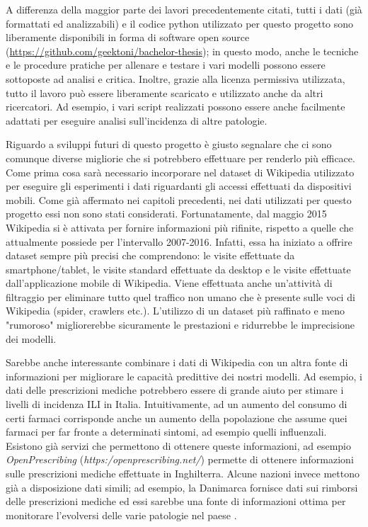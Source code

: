 A differenza della maggior parte dei lavori precedentemente citati, tutti i dati (già formattati ed analizzabili) e il codice 
python utilizzato per questo progetto sono liberamente disponibili in forma di software open source (\url{https://github.com/geektoni/bachelor-thesis}); in questo modo, 
anche le tecniche e le procedure pratiche per allenare e testare i vari modelli possono essere sottoposte ad analisi e 
critica. Inoltre, grazie alla licenza permissiva utilizzata, tutto il lavoro può essere liberamente scaricato e utilizzato 
anche da altri ricercatori. Ad esempio, i vari script realizzati possono essere anche facilmente adattati per eseguire
analisi sull'incidenza di altre patologie.
\bigskip

Riguardo a sviluppi futuri di questo progetto è giusto segnalare che ci sono comunque diverse migliorie che si potrebbero 
effettuare per renderlo più efficace. Come prima cosa sarà necessario incorporare nel dataset di 
Wikipedia utilizzato per eseguire gli esperimenti i dati riguardanti gli accessi effettuati da dispositivi mobili. 
Come già affermato nei capitoli precedenti, nei dati utilizzati per questo progetto essi non sono stati considerati. 
Fortunatamente, dal maggio 2015 Wikipedia si è attivata per fornire informazioni più rifinite, rispetto a quelle che 
attualmente possiede per l'intervallo 2007-2016. Infatti, essa ha iniziato a offrire dataset sempre più precisi che 
comprendono: le visite effettuate da smartphone/tablet, le visite standard effettuate da desktop e le visite 
effettuate dall'applicazione mobile di Wikipedia. Viene effettuata anche un'attività di filtraggio per eliminare tutto quel 
traffico non umano che è presente sulle voci di Wikipedia (spider, crawlers etc.). L'utilizzo di un dataset più raffinato e 
meno "rumoroso" migliorerebbe sicuramente le prestazioni e ridurrebbe le imprecisione dei modelli. 
\bigskip

Sarebbe anche interessante combinare i dati di Wikipedia con un altra fonte di informazioni per migliorare le capacità 
predittive dei nostri modelli. Ad esempio, i dati delle prescrizioni mediche potrebbero essere di grande aiuto per stimare i 
livelli di incidenza ILI in Italia. Intuitivamente, ad un aumento del consumo di certi farmaci corrisponde anche un aumento 
della popolazione che assume quei farmaci per far fronte a determinati sintomi, ad esempio quelli influenzali. Esistono già 
servizi che permettono di ottenere queste informazioni, ad esempio \textit{OpenPrescribing} 
(\textit{https:/openprescribing.net/}) permette di ottenere informazioni sulle prescrizioni mediche effettuate in 
Inghilterra. Alcune nazioni invece mettono già a disposizione dati simili; ad esempio, la Danimarca fornisce dati sui 
rimborsi delle prescrizioni mediche ed essi sarebbe una fonte di informazioni ottima per monitorare l'evolversi delle varie 
patologie nel paese \cite{sigrun2012}.
\bigskip

